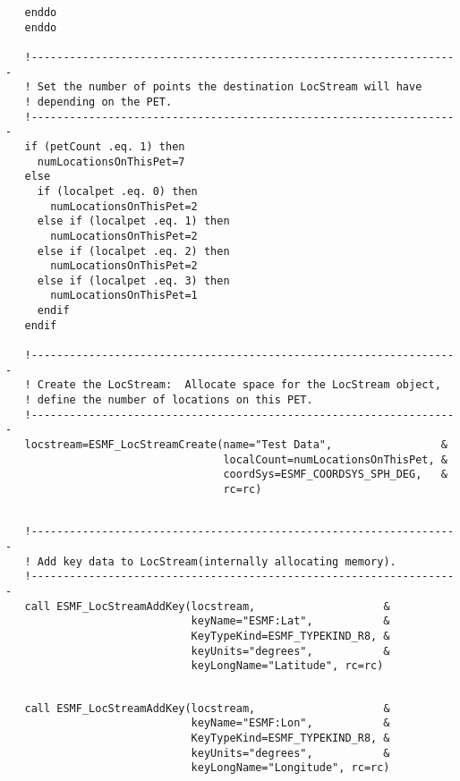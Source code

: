  \begin{verbatim}
   enddo
   enddo

   !-------------------------------------------------------------------
   ! Set the number of points the destination LocStream will have
   ! depending on the PET. 
   !-------------------------------------------------------------------
   if (petCount .eq. 1) then
     numLocationsOnThisPet=7
   else
     if (localpet .eq. 0) then
       numLocationsOnThisPet=2
     else if (localpet .eq. 1) then
       numLocationsOnThisPet=2
     else if (localpet .eq. 2) then
       numLocationsOnThisPet=2
     else if (localpet .eq. 3) then
       numLocationsOnThisPet=1
     endif
   endif

   !-------------------------------------------------------------------
   ! Create the LocStream:  Allocate space for the LocStream object,
   ! define the number of locations on this PET. 
   !-------------------------------------------------------------------
   locstream=ESMF_LocStreamCreate(name="Test Data",                 &
                                  localCount=numLocationsOnThisPet, &
                                  coordSys=ESMF_COORDSYS_SPH_DEG,   &
                                  rc=rc)
 
\end{verbatim}
 

 \begin{verbatim}
   !-------------------------------------------------------------------
   ! Add key data to LocStream(internally allocating memory).
   !-------------------------------------------------------------------
   call ESMF_LocStreamAddKey(locstream,                    &
                             keyName="ESMF:Lat",           &
                             KeyTypeKind=ESMF_TYPEKIND_R8, &
                             keyUnits="degrees",           &
                             keyLongName="Latitude", rc=rc)
 
\end{verbatim}
 

 \begin{verbatim}
   call ESMF_LocStreamAddKey(locstream,                    &
                             keyName="ESMF:Lon",           &
                             KeyTypeKind=ESMF_TYPEKIND_R8, &
                             keyUnits="degrees",           &
                             keyLongName="Longitude", rc=rc)
 
\end{verbatim}
 
